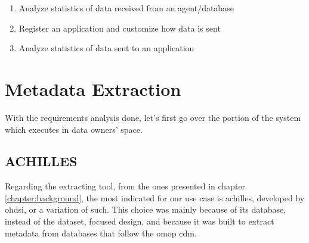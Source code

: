 \begin{enumerate}
    \item Analyze statistics of data received from an agent/database

    \item Register an application and customize how data is sent

    \item Analyze statistics of data sent to an application

\end{enumerate}

\section{Metadata Extraction}

With the requirements analysis done, let's first go over the portion of the system which executes in data owners' space.

\subsection{ACHILLES}

Regarding the extracting tool, from the ones presented in chapter \ref{chapter:background}, the most indicated for our use case is \gls{achilles}, developed by \gls{ohdsi}, or a variation of such.
This choice was mainly because of its database, instead of the dataset, focused design, and because it was built to extract metadata from databases that follow the \gls{omop} \gls{cdm}.

